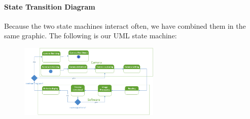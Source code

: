 	\paragraph{State Transition Diagram}
	Because the two state machines interact often, we have combined them in the same graphic. The following is our UML state machine:\\
	\begin{figure}[H] 
		\centering
		\includegraphics[width=0.6\textwidth,natwidth=610,natheight=642]{images/StateTransition_Diagram.png}  
		\end{figure}

